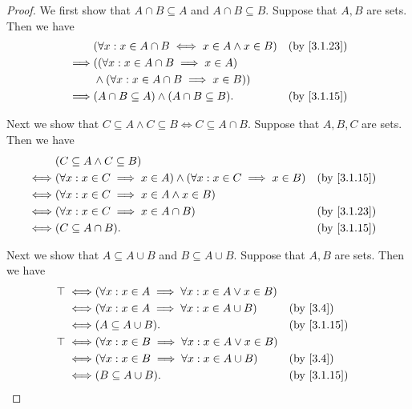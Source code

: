 \begin{proof}
  We first show that \(A \cap B \subseteq A\) and \(A \cap B \subseteq B\).
  Suppose that \(A, B\) are sets.
  Then we have
  \begin{align*}
             & (\forall x : x \in A \cap B \iff x \in A \land x \in B) &  & \text{(by \cref{3.1.23})} \\
    \implies & ((\forall x : x \in A \cap B \implies x \in A)                                         \\
             & \land (\forall x : x \in A \cap B \implies x \in B))                                   \\
    \implies & (A \cap B \subseteq A) \land (A \cap B \subseteq B).    &  & \text{(by \cref{3.1.15})}
  \end{align*}

  Next we show that \(C \subseteq A \land C \subseteq B \iff C \subseteq A \cap B\).
  Suppose that \(A, B, C\) are sets.
  Then we have
  \begin{align*}
         & (C \subseteq A \land C \subseteq B)                                                                                \\
    \iff & (\forall x : x \in C \implies x \in A) \land (\forall x : x \in C \implies x \in B) &  & \text{(by \cref{3.1.15})} \\
    \iff & (\forall x : x \in C \implies x \in A \land x \in B)                                                               \\
    \iff & (\forall x : x \in C \implies x \in A \cap B)                                       &  & \text{(by \cref{3.1.23})} \\
    \iff & (C \subseteq A \cap B).                                                             &  & \text{(by \cref{3.1.15})}
  \end{align*}

  Next we show that \(A \subseteq A \cup B\) and \(B \subseteq A \cup B\).
  Suppose that \(A, B\) are sets.
  Then we have
  \begin{align*}
    \top \iff & (\forall x : x \in A \implies \forall x : x \in A \lor x \in B)                                \\
    \iff      & (\forall x : x \in A \implies \forall x : x \in A \cup B)       &  & \text{(by \cref{3.4})}    \\
    \iff      & (A \subseteq A \cup B).                                         &  & \text{(by \cref{3.1.15})} \\
    \top \iff & (\forall x : x \in B \implies \forall x : x \in A \lor x \in B)                                \\
    \iff      & (\forall x : x \in B \implies \forall x : x \in A \cup B)       &  & \text{(by \cref{3.4})}    \\
    \iff      & (B \subseteq A \cup B).                                         &  & \text{(by \cref{3.1.15})}
  \end{align*}


\end{proof}
